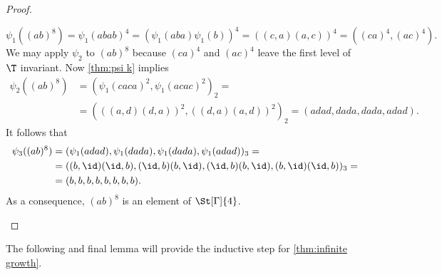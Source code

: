 \begin{proof}
\begin{plist}
\begin{equation*}
\psi_1((ab)^8)=\psi_1(abab)^4=(\psi_1(aba)\psi_1(b))^4=((c,a)(a,c))^4=((ca)^4,(ac)^4).
\end{equation*}
We may apply $\psi_2$ to $(ab)^8$ because $(ca)^4$ and $(ac)^4$ leave the first level of $\T$ invariant. Now \cref{thm:psi k} implies
\begin{align*}
\psi_2((ab)^8)	&=\left(\psi_1(caca)^2,\psi_1(acac)^2\right)_2=\\
				&=\left(((a,d)(d,a))^2,((d,a)(a,d))^2\right)_2=(adad,dada,dada,adad).
\end{align*}
It follows that 
\begin{align*}
\psi_3((ab)^8)	&=(\psi_1(adad),\psi_1(dada),\psi_1(dada),\psi_1(adad))_3=\\
				&=((b,\id)(\id,b),(\id,b)(b,\id),(\id,b)(b,\id),(b,\id)(\id,b))_3=\\
				&=(b,b,b,b,b,b,b,b).
\end{align*}
As a consequence, $(ab)^8$ is an element of $\St[\Gamma]{4}$.
\end{plist}
\end{proof}

The following and final lemma will provide the inductive step for \cref{thm:infinite growth}.

